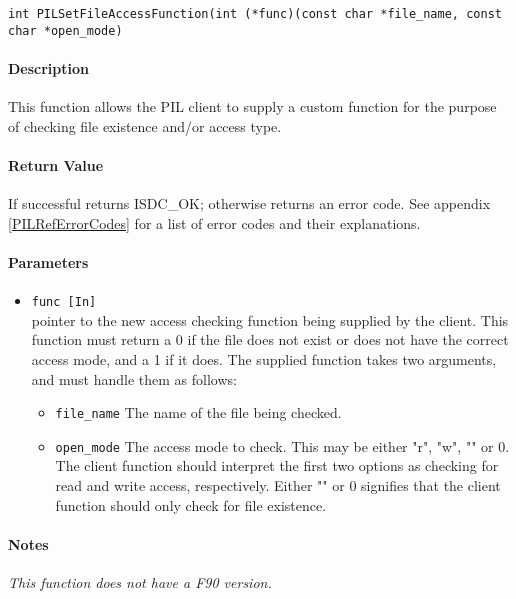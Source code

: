 \begin{verbatim}
int PILSetFileAccessFunction(int (*func)(const char *file_name, const char *open_mode)
\end{verbatim}

\paragraph{Description\\}
This function allows the PIL client to supply a custom function for the
purpose of checking file existence and/or access type.

\paragraph{Return Value\\}
If successful returns ISDC\_OK; otherwise returns an error code. See appendix \ref{PILRefErrorCodes}
for a list of error codes and their explanations.

\paragraph{Parameters}
\begin{itemize}
\item
{\tt func [In] } \\
pointer to the new access checking function being supplied by the client. This function
must return a 0 if the file does not exist or does not have the correct access
mode, and a 1 if it does. The supplied function takes two arguments, and must handle
them as follows:
   \begin{itemize}
   \item
   {\tt file\_name} The name of the file being checked.
   \item
   {\tt open\_mode} The access mode to check. This may be either "r", "w", "" or 0.
   The client function should interpret the first two options as checking for
   read and write access, respectively. Either "" or 0 signifies that the client
   function should only check for file existence.
   \end{itemize}
\end{itemize}

\paragraph{Notes\\}
{\it
This function does not have a F90 version.
}


